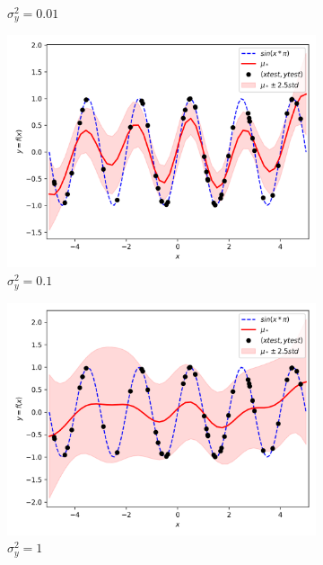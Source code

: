 \documentclass{article}
\begin{document}
\begin{figure}[ht]
\begin{subfigure}{.33\textwidth}
    \caption{$\sigma_y^2 = 0.01$}
    \label{fig:noise001}
  \end{subfigure}
  \begin{subfigure}{.33\textwidth}
    \centering
    \includegraphics[width=\linewidth]{kernelSE/noise/0_1.png}
    \caption{$\sigma_y^2 = 0.1$}
    \label{fig:noise01}
  \end{subfigure}
  \begin{subfigure}{.33\textwidth}
    \centering
    \includegraphics[width=\linewidth]{kernelSE/noise/1.png}
    \caption{$\sigma_y^2 = 1$}
    \label{fig:noise1}
  \end{subfigure}
  \begin{subfigure}{.33\textwidth}
    \centering

\end{subfigure}
\end{figure}
\end{document}
